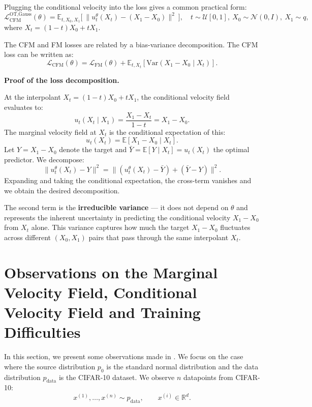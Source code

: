 \documentclass[11pt]{article}
\begin{document}
Plugging the conditional velocity into the loss gives a common practical form:
\begin{equation}
\mathcal{L}^{\text{OT,Gauss}}_{\text{CFM}}(\theta)
= \mathbb{E}_{t,X_0,X_1}\Big[\ \|u^\theta_t(X_t)-(X_1-X_0)\|^2\ \Big],
\quad t\sim\mathcal{U}[0,1],\ X_0\sim\mathcal{N}(0,I),\ X_1\sim q,
\end{equation}
where $X_t=(1-t)X_0+tX_1$.

The CFM and FM losses are related by a bias-variance decomposition. The CFM loss can be written as:
\begin{equation}
\mathcal{L}_{\text{CFM}}(\theta) = \mathcal{L}_{\text{FM}}(\theta) + \mathbb{E}_{t, X_t}\left[\mathrm{Var}(X_1 - X_0 \mid X_t)\right].
\end{equation}

\begin{calloutnote}
\textbf{Proof of the loss decomposition.}

At the interpolant $X_t = (1-t)X_0 + tX_1$, the conditional velocity field evaluates to:
\begin{equation}
u_t(X_t \mid X_1) = \frac{X_1 - X_t}{1-t} = X_1 - X_0.
\end{equation}
The marginal velocity field at $X_t$ is the conditional expectation of this:
\begin{equation}
u_t(X_t) = \mathbb{E}[X_1 - X_0 \mid X_t].
\end{equation}
Let $Y = X_1 - X_0$ denote the target and $\bar{Y} = \mathbb{E}[Y \mid X_t] = u_t(X_t)$ the optimal predictor. We decompose:
\begin{equation}
\|u^\theta_t(X_t) - Y\|^2 = \|(u^\theta_t(X_t) - \bar{Y}) + (\bar{Y} - Y)\|^2.
\end{equation}
Expanding and taking the conditional expectation, the cross-term vanishes and we obtain the desired decomposition.
\end{calloutnote}

The second term is the \textbf{irreducible variance} --- it does not depend on $\theta$ and represents the inherent uncertainty in predicting the conditional velocity $X_1 - X_0$ from $X_t$ alone. This variance captures how much the target $X_1 - X_0$ fluctuates across different $(X_0, X_1)$ pairs that pass through the same interpolant $X_t$.

\section{Observations on the Marginal Velocity Field, Conditional Velocity Field and Training Difficulties}\label{sec-observations-on-the-marginal-velocity-field-conditional-velocity-field-and-training-difficulties}
In this section, we present some observations made in \cite{bertrand_closed-form_2025}. We focus on the case where the source distribution $p_0$ is the standard normal distribution and the data distribution $p_{\text{data}}$ is the CIFAR-10 dataset. We observe $n$ datapoints from CIFAR-10:
\begin{equation}
x^{(1)},\dots,x^{(n)} \sim p_{\text{data}}, \qquad x^{(i)}\in\mathbb{R}^d.
\end{equation}
\end{document}
